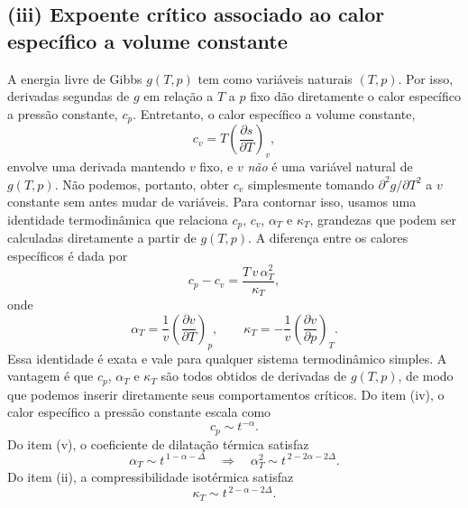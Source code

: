 \documentclass[11pt,a4paper]{article}
\begin{document}
\subsection*{(iii) Expoente crítico associado ao calor específico a volume constante}
% 
A energia livre de Gibbs \(g(T,p)\) tem como variáveis naturais \((T,p)\).
Por isso, derivadas segundas de \(g\) em relação a \(T\) a \(p\) fixo dão
diretamente o calor específico a pressão constante, \(c_p\). Entretanto, o
calor específico a volume constante,
%
\begin{equation}
    c_v
    =
    T\left(\frac{\partial s}{\partial T}\right)_v,
    \label{eq:cv_def_p1}
\end{equation}
%
envolve uma derivada mantendo \(v\) fixo, e \(v\) \emph{não} é uma variável
natural de \(g(T,p)\). Não podemos, portanto, obter \(c_v\) simplesmente
tomando \(\partial^2 g/\partial T^2\) a \(v\) constante sem antes mudar de
variáveis. Para contornar isso, usamos uma identidade termodinâmica que
relaciona \(c_p\), \(c_v\), \(\alpha_T\) e \(\kappa_T\), grandezas que podem
ser calculadas diretamente a partir de \(g(T,p)\). A diferença entre os calores específicos é dada por
%
\begin{equation}
    c_p-c_v
    =
    \frac{T\,v\,\alpha_T^{2}}{\kappa_T},
    \label{eq:cp_cv}
\end{equation}
%
onde
%
\begin{equation}
    \alpha_T
    =
    \frac{1}{v}\left(\frac{\partial v}{\partial T}\right)_p,
    \qquad
    \kappa_T
    =
    -\frac{1}{v}\left(\frac{\partial v}{\partial p}\right)_T.
\end{equation}
%
Essa identidade é exata e vale para qualquer sistema termodinâmico simples.
A vantagem é que \(c_p\), \(\alpha_T\) e \(\kappa_T\) são todos obtidos de
derivadas de \(g(T,p)\), de modo que podemos inserir diretamente seus
comportamentos críticos. Do item (iv), o calor específico a pressão constante escala como
%
\begin{equation}
    c_p\sim t^{-\alpha}.
    \label{eq:cp_iii_p1}
\end{equation}
%
Do item (v), o coeficiente de dilatação térmica satisfaz
%
\begin{equation}
    \alpha_T\sim t^{\,1-\alpha-\Delta}
    \quad\Longrightarrow\quad
    \alpha_T^{2}\sim t^{\,2-2\alpha-2\Delta}.
    \label{eq:alphaT2_iii_p1}
\end{equation}
%
Do item (ii), a compressibilidade isotérmica satisfaz
%
\begin{equation}
    \kappa_T\sim t^{\,2-\alpha-2\Delta}.
    \label{eq:kappa_iii_p1}
\end{equation}
\end{document}
